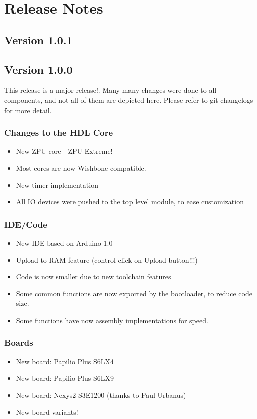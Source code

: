 \chapter{Release Notes}

\section{Version 1.0.1}

\section{Version 1.0.0}

This release is a major release!. Many many changes were done to all components, and not all of them are
depicted here. Please refer to git changelogs for more detail.

\subsection*{Changes to the HDL Core}

\begin{itemize}
\item New ZPU core - ZPU Extreme!
\item Most cores are now Wishbone compatible.
\item New timer implementation 
\item All IO devices were pushed to the top level module, to ease customization 
\end{itemize}

\subsection*{IDE/Code}

\begin{itemize}
 \item New IDE based on Arduino 1.0
 \item Upload-to-RAM feature (control-click on Upload button!!!)
 \item Code is now smaller due to new toolchain features
 \item Some common functions are now exported by the bootloader, to reduce code size.
 \item Some functions have now assembly implementations for speed.
\end{itemize}

\subsection*{Boards}
\begin{itemize}
 \item New board: Papilio Plus S6LX4
 \item New board: Papilio Plus S6LX9
 \item New board: Nexys2 S3E1200 (thanks to Paul Urbanus)
 \item New board variants!
\end{itemize}


